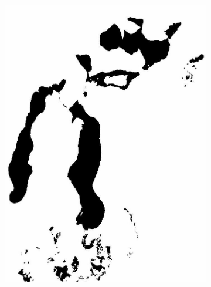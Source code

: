 \documentclass[12pt,a4paper]{article}
\begin{document}
\begin{figure}
\begin{subfigure}[b]{0.19\textwidth}
         \includegraphics[width=\textwidth]{../img/2010w.jpg}
         \caption{}
         \label{fig:}
     \end{subfigure}
     \begin{subfigure}[b]{0.19\textwidth}
         \centering

\end{subfigure}
\end{figure}
\end{document}
